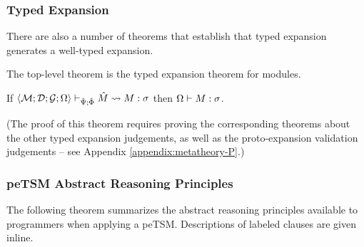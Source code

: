 \subsubsection{Typed Expansion}
There are also a number of theorems that establish that typed expansion generates a well-typed expansion.

The top-level theorem is the typed expansion theorem for modules. 

\begingroup
\def\thetheorem{\ref{thm:module-expansion-P}}
\begin{theorem}
If $\langle \mathcal{M}; \mathcal{D}; \mathcal{G}; \Omega \rangle \vdash_{\hat{\Psi}; \hat\Phi} {\hat M} \leadsto M : \sigma$ then $\Omega \vdash M : \sigma$.
\end{theorem}
\endgroup

(The proof of this theorem requires proving the corresponding theorems about the other typed expansion judgements, as well as the proto-expansion validation judgements -- see Appendix \ref{appendix:metatheory-P}.)

\subsubsection{peTSM Abstract Reasoning Principles}
The following theorem summarizes the abstract reasoning principles available to programmers when applying a peTSM. Descriptions of labeled clauses are given inline.

